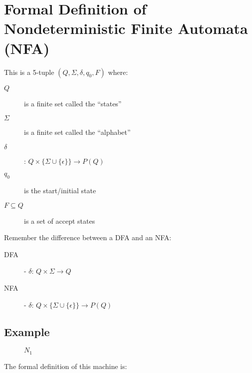 \documentclass{article}
\begin{document}
\section*{Formal Definition of Nondeterministic Finite Automata (NFA)}

This is a 5-tuple $(Q,\Sigma,\delta,q_0,F)$ where:

\begin{description}
\item[$Q$] is a finite set called the ``states''
\item[$\Sigma$] is a finite set called the ``alphabet''
\item[$\delta$]: $Q\times\{\Sigma\cup\{\epsilon\}\}\rightarrow{}P(Q)$
\item[$q_0$] is the start/initial state
\item[$F\subseteq{}Q$] is a set of accept states
\end{description}

Remember the difference between a DFA and an NFA:

\begin{description}
\item[DFA] - $\delta$: $Q\times{}\Sigma\rightarrow{}Q$
\item[NFA] - $\delta$: $Q\times\{\Sigma\cup\{\epsilon\}\}\rightarrow{}P(Q)$
\end{description}

\subsection*{Example}

\begin{figure}[H]
  \centering
  \caption{$N_1$}
\end{figure}

The formal definition of this machine is:
\end{document}
